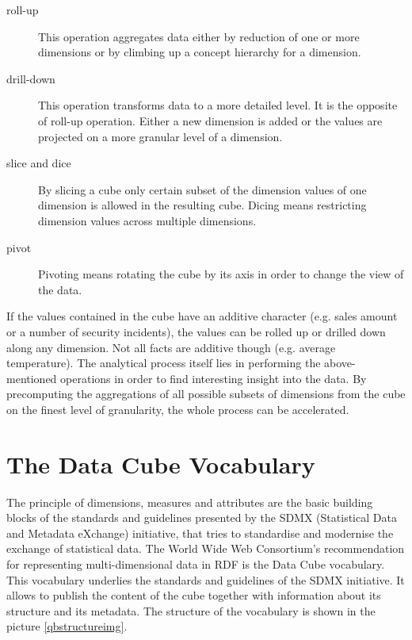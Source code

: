 \begin{description}
    \item[roll-up] This operation aggregates data either by reduction of one or more dimensions or by climbing up a concept hierarchy for a dimension.
    \item[drill-down] This operation transforms data to a more detailed level. It is the opposite of roll-up operation. Either a new dimension is added or the values are projected on a more granular level of a dimension.
    \item[slice and dice] By slicing a cube only certain subset of the dimension values of one dimension is allowed in the resulting cube. Dicing means restricting dimension values across multiple dimensions.
    \item[pivot] Pivoting means rotating the cube by its axis in order to change the view of the data.
\end{description}

If the values contained in the cube have an additive character (e.g. sales amount or a number of security incidents), the values can be rolled up or drilled down along any dimension. Not all facts are additive though (e.g. average temperature). The analytical process itself lies in performing the above-mentioned operations in order to find interesting insight into the data. By precomputing the aggregations of all possible subsets of dimensions from the cube on the finest level of granularity, the whole process can be accelerated.

\section{The Data Cube Vocabulary\label{dcv}}

The principle of dimensions, measures and attributes are the basic building blocks of the standards and guidelines presented by the SDMX (Statistical Data and Metadata eXchange) initiative, that tries to standardise and modernise the exchange of statistical data. The World Wide Web Consortium's recommendation for representing multi-dimensional data in RDF is the Data Cube vocabulary.\cite{dcv2014} This vocabulary underlies the standards and guidelines of the SDMX initiative. It allows to publish the content of the cube together with information about its structure and its metadata. The structure of the vocabulary is shown in the picture \ref{qbstructureimg}.

